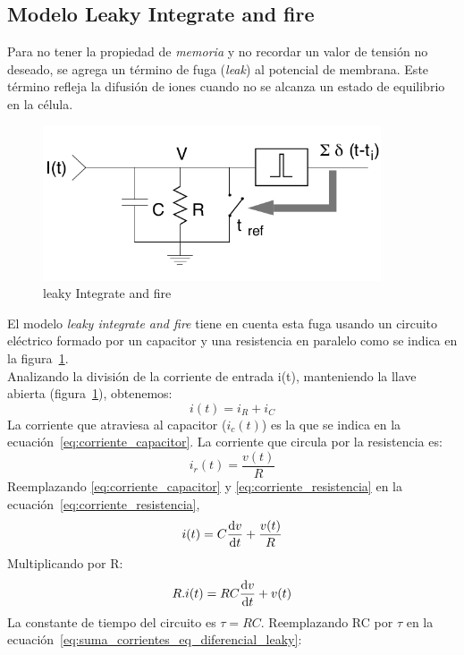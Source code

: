 \subsection{Modelo Leaky Integrate and fire}\label{sec:modelo_leaky_integrate_and_fire}
Para no tener la propiedad de \textit{memoria} y no recordar un valor de tensión no deseado, se agrega un término de fuga (\textit{leak}) al potencial de membrana. Este término refleja la difusión de iones cuando no se alcanza un estado de equilibrio en la célula.
\begin{figure}[htbp!]
    \centering
    \includegraphics[width=10cm]{figures/leaky_integrate_and_fire.png}
    \caption{leaky Integrate and fire}
    \label{fig:leaky_integrate_and_fire}
\end{figure}
 El modelo \textit{leaky integrate and fire} tiene en cuenta esta fuga usando un circuito eléctrico formado por un capacitor y una resistencia en paralelo como se indica en la figura~\ref{fig:leaky_integrate_and_fire}.\\
Analizando la división de la corriente de entrada i(t), manteniendo la llave abierta (figura~\ref{fig:leaky_integrate_and_fire}), obtenemos:
\begin{equation}\label{eq:suma_corrientes_leaky}
    i(t)= i_R + i_C
\end{equation}
La corriente que atraviesa al capacitor ($i_c(t)$) es la que se indica en la ecuación~\ref{eq:corriente_capacitor}. La corriente que circula por la resistencia es:
\begin{equation}\label{eq:corriente_resistencia}
    \boxed{i_r(t)=\frac{v(t)}{R}}
\end{equation}
Reemplazando \ref{eq:corriente_capacitor} y \ref{eq:corriente_resistencia} en la ecuación~\ref{eq:corriente_resistencia},
\[
i(t)= C\dv{v}{t}+ \frac{v(t)}{R}
\]
Multiplicando por R:
\begin{equation}\label{eq:suma_corrientes_eq_diferencial_leaky}
    R.i(t)=RC \dv{v}{t} + v(t)
\end{equation}
La constante de tiempo del circuito es $\tau=RC$. Reemplazando RC por $\tau$ en la ecuación~\ref{eq:suma_corrientes_eq_diferencial_leaky}:
